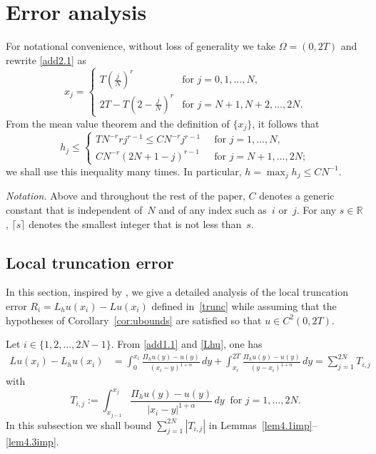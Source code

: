 \documentclass[smallextended]{svjour3}       %
\begin{document}
%
%
\section{Error analysis}\label{sec:error}
For notational convenience, without loss of generality  we take $\Omega=\left( 0,2T \right)$ and  rewrite \eqref{add2.1} as
\begin{equation}\label{xj}
	x_j= \begin{cases}
		T\left( \frac{j}{N} \right) ^r	&\text{for } j=0,1,\dots ,N,\\
		2T-T\left( 2-\frac{j}{N} \right) ^r &\text{for } j=N+1,N+2,\dots ,2N.
	\end{cases}
\end{equation}
From the mean value theorem and the definition of $\{x_j\}$, it follows that
\begin{equation}\label{hj}
	h_j  \le
	\begin{cases}
		TN^{-r}r j^{r-1} \le CN^{-r}j^{r-1} \ &\text{ for } j=1,\dots, N, \\
		CN^{-r}(2N+1-j)^{r-1} \ &\text{ for } j=N+1,\dots, 2N;
	\end{cases}
\end{equation}
we shall use this inequality many times. In particular, $h = \max_j h_j\le CN^{-1}$.

\emph{Notation.} Above and throughout the rest of the paper, $C$ denotes a generic constant that is independent of~$N$ and of any index such as~$i$ or~$j$.
For any $s\in \mathbb{R}$, $\lceil s \rceil$ denotes the smallest integer that is not less than~$s$.




%
%
\subsection{Local truncation error}\label{sec:localtrunc}
In this section, inspired by \cite{CQSW:2021,Stynes2017}, we give a detailed analysis of the local truncation error $R_i=L_hu(x_i)-Lu(x_i)$ defined in~\eqref{trunc}  while assuming that the hypotheses of  Corollary~\ref{cor:ubounds} are satisfied so that $u\in C^2(0,2T)$.

Let $i\in \{1,2,\dots, 2N-1\}$.
From \eqref{add1.1} and \eqref{Lhu}, one has
\begin{equation*}
	\begin{split}
		Lu(x_i) - L_hu(x_i)
		&=\!\int_{0 }^{x_i}{\frac{\Pi_h u(y)-u(y)}{( x_i-y )^{1+\alpha } } \,dy}
		+ \int_{x_i}^{2T}{\frac{\Pi_h u(y)-u(y)}{( y-x_i )^{1+\alpha } } \,dy}
		=\sum_{j=1}^{2N}{T_{i,j}}
	\end{split}
\end{equation*}
with
\begin{equation}\label{add4.1}
	T_{i,j}
	:=\int_{x_{j-1}}^{x_{j}}{\frac{\Pi_h u(y)-u(y)}{| x_i-y |^{1+\alpha } } \,dy}\ \text{ for } j=1,\dots, 2N.
\end{equation}
In this subsection we shall  bound $\sum_{j=1}^{2N}{|T_{i,j}|}$ in Lemmas~\ref{lem4.1imp}--\ref{lem4.3imp}.
\end{document}
